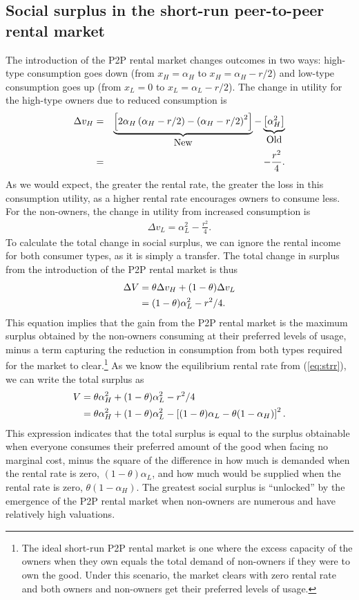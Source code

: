 \documentclass[11pt]{article}
\begin{document}
\subsection{Social surplus in the short-run peer-to-peer rental market}
The introduction of the P2P rental market changes outcomes in two ways: 
high-type consumption goes down (from $x_H = \alpha_H$ to  $x_H = \alpha_H - r/2$) and low-type consumption goes up (from $x_L = 0$ to $x_L = \alpha_L - r/2$). 
The change in utility for the high-type owners due to reduced consumption is 
\begin{eqnarray}
\Delta v_H &=& \underbrace{\left[2 \alpha_H \left(\alpha_H - r/2\right) - \left(\alpha_H - r/2\right)^2 \right]}_{\mbox{New}} - 
                             \underbrace{\left[\alpha_H^2 \right]}_{\mbox{Old}}   \notag \\
           &=& - \frac{r^2}{4}. 
\end{eqnarray} 
As we would expect, the greater the rental rate, the greater the loss in this consumption utility, as a higher rental rate encourages owners to consume less. 
For the non-owners, the change in utility from increased consumption is
\begin{align}
\Delta v_L = \alpha_L^2 - \frac{r^2}{4}. 
\end{align} 
To calculate the total change in social surplus, we can ignore the rental income for both consumer types, as it is simply a transfer. 
The total change in surplus from the introduction of the P2P rental market is thus 
\begin{align}
\Delta V &= \theta \Delta v_H + (1-\theta) \Delta v_L \notag \\ 
         & = (1-\theta) \alpha_L^2 - r^2/4.
\end{align}
This equation implies that the gain from the P2P rental market is the
maximum surplus obtained by the non-owners consuming at their
preferred levels of usage, minus a term capturing the reduction in consumption from both types required for the market to clear.\footnote{
  The ideal short-run P2P rental market is one where the excess capacity of the owners when they own equals the total demand of non-owners if they were to own the good.
  Under this scenario, the market clears with zero rental rate and both owners and non-owners get their preferred levels of usage. 
}
As we know the equilibrium rental rate from (\ref{eq:strr}), we can write the total surplus as
\begin{align}
  V & = \theta \alpha_H^2 + (1-\theta)\alpha_L^2 - r^2/4 \notag \\
    & = \theta \alpha_H^2 + (1-\theta)\alpha_L^2 - \left[(1-\theta) \alpha_L - \theta (1-\alpha_H) \right]^2.
\end{align} 
This expression indicates that the total surplus is equal to the surplus obtainable when everyone consumes their preferred amount of the good when facing no marginal cost, minus the square of the difference in how much is demanded when the rental rate is zero, $(1-\theta)\alpha_L$, and how much would be supplied when the rental rate is zero, $\theta (1-\alpha_H)$.
The greatest social surplus is ``unlocked'' by the emergence of the P2P rental market when non-owners are numerous and have relatively high valuations. 
\end{document}
